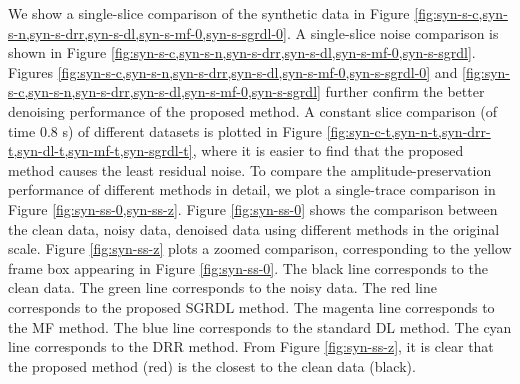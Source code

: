 We show a single-slice comparison of the synthetic data in Figure \ref{fig:syn-s-c,syn-s-n,syn-s-drr,syn-s-dl,syn-s-mf-0,syn-s-sgrdl-0}. A single-slice noise comparison is shown in Figure \ref{fig:syn-s-c,syn-s-n,syn-s-drr,syn-s-dl,syn-s-mf-0,syn-s-sgrdl}. Figures \ref{fig:syn-s-c,syn-s-n,syn-s-drr,syn-s-dl,syn-s-mf-0,syn-s-sgrdl-0} and \ref{fig:syn-s-c,syn-s-n,syn-s-drr,syn-s-dl,syn-s-mf-0,syn-s-sgrdl} further confirm the better denoising performance of the proposed method.  A constant slice comparison (of time 0.8 s) of different datasets is plotted in Figure \ref{fig:syn-c-t,syn-n-t,syn-drr-t,syn-dl-t,syn-mf-t,syn-sgrdl-t}, where it is easier to find that the proposed method causes the least residual noise. To compare the amplitude-preservation performance of different methods in detail, we plot a single-trace comparison in Figure \ref{fig:syn-ss-0,syn-ss-z}. Figure \ref{fig:syn-ss-0} shows the comparison between the clean data, noisy data, denoised data using different methods in the original scale. Figure \ref{fig:syn-ss-z} plots a zoomed comparison, corresponding to the yellow frame box appearing in Figure \ref{fig:syn-ss-0}. The black line corresponds to the clean data. The green line corresponds to the noisy data. The red line corresponds to the proposed SGRDL method. The magenta line corresponds to the MF method. The blue line corresponds to the standard DL method. The cyan line corresponds to the DRR method. From Figure \ref{fig:syn-ss-z}, it is clear that the proposed method (red) is the closest to the clean data (black).




